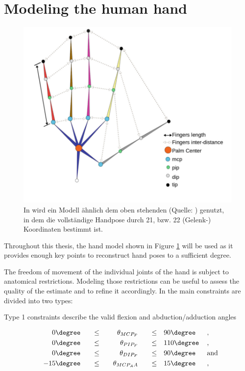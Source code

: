	
	
\section { Modeling the human hand }
	
	\begin{figure}
		\centering
		\includegraphics[width=0.7\linewidth]{Ressourcen/malik2018_hand_model}
		\caption[Handmodell nach \cite{Malik2018b}]{In \cite{Malik2018b} wird ein Modell ähnlich dem oben stehenden (Quelle: \cite{Malik2018b}) genutzt, in dem die vollständige Handpose durch 21, bzw. 22 (Gelenk-) Koordinaten bestimmt ist.}
		\label{fig:malik2018handmodel}
	\end{figure}
	Throughout this thesis, the hand model shown in Figure \ref{fig:malik2018handmodel} will be used as it provides enough key points to reconstruct hand poses to a sufficient degree.
	
	The freedom of movement of the individual joints of the hand is subject to anatomical restrictions. Modeling those restrictions can be useful to assess the quality of the estimate and to refine it accordingly. In \cite{Lin2000} the main constraints are divided into two types: 
	
	Type 1 constraints describe the valid flexion and abduction/adduction angles
	
	\begin{alignat}{7}
		&&0\degree \quad &&\leq \quad &&\theta_{MCP_F} \quad &&\leq \quad &90\degree\, &&,\\
		&&0\degree \quad &&\leq \quad &&\theta_{PIP_F} \quad &&\leq \quad &110\degree\,&& ,\\
		&&0\degree \quad &&\leq \quad &&\theta_{DIP_F} \quad &&\leq \quad &90\degree\, && \text{and}\\
		&&-15\degree \quad &&\leq \quad &&\theta_{MCP_AA} \quad &&\leq \quad &15\degree\, &&,
	\end{alignat}
	
